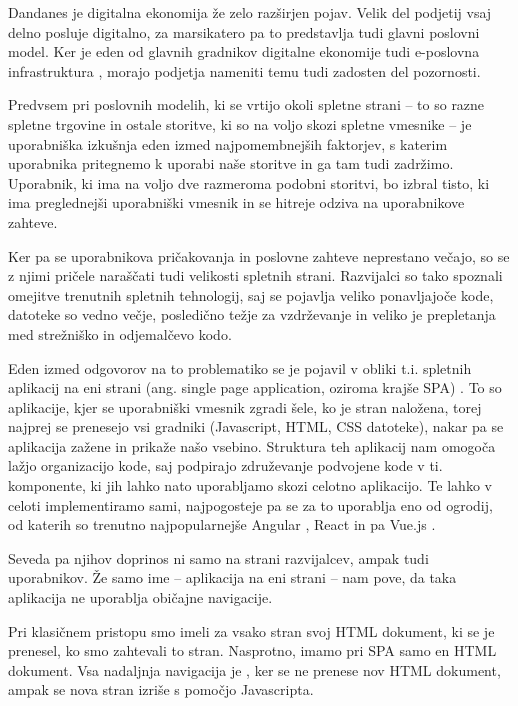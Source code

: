 \documentclass[a4paper, 12pt]{book}
\begin{document}
Dandanes je digitalna ekonomija že zelo razširjen pojav. Velik del podjetij vsaj delno posluje digitalno, za marsikatero pa to predstavlja tudi glavni poslovni model. Ker je eden od glavnih gradnikov digitalne ekonomije tudi e-poslovna infrastruktura \cite{digital_econ}, morajo podjetja nameniti temu tudi zadosten del pozornosti.

Predvsem pri poslovnih modelih, ki se vrtijo okoli spletne strani – to so razne spletne trgovine in ostale storitve, ki so na voljo skozi spletne vmesnike – je uporabniška izkušnja eden izmed najpomembnejših faktorjev, s katerim uporabnika pritegnemo k uporabi naše storitve in ga tam tudi zadržimo. Uporabnik, ki ima na voljo dve razmeroma podobni storitvi, bo izbral  tisto, ki ima preglednejši uporabniški vmesnik in se hitreje odziva na uporabnikove zahteve. 

Ker pa se uporabnikova pričakovanja in poslovne zahteve neprestano večajo, so se z njimi pričele naraščati tudi velikosti spletnih strani. Razvijalci so tako spoznali omejitve trenutnih spletnih tehnologij, saj se pojavlja veliko ponavljajoče kode, datoteke so vedno večje, posledično težje za vzdrževanje in veliko je prepletanja med strežniško in odjemalčevo kodo.

Eden izmed odgovorov na to problematiko se je pojavil v obliki t.i. spletnih aplikacij na eni strani (ang. single page application, oziroma krajše SPA) \cite{spa_blakit} \cite{spa_vs_multi} \cite{spa_presentation}. To so aplikacije, kjer se uporabniški vmesnik zgradi šele, ko je stran naložena, torej najprej se prenesejo vsi gradniki (Javascript, HTML, CSS datoteke), nakar pa se aplikacija zažene in prikaže našo vsebino. Struktura teh aplikacij nam omogoča lažjo organizacijo kode, saj podpirajo združevanje podvojene kode v ti. komponente, ki jih lahko nato uporabljamo skozi celotno aplikacijo. Te lahko v celoti implementiramo sami, najpogosteje pa se za to uporablja eno od ogrodij, od katerih so trenutno najpopularnejše Angular \cite{angular_website}, React \cite{react_website} in pa Vue.js \cite{vue_website}.

Seveda pa njihov doprinos ni samo na strani razvijalcev, ampak tudi uporabnikov. Že samo ime -- aplikacija na eni strani -- nam pove, da taka aplikacija ne uporablja običajne navigacije.

Pri klasičnem pristopu smo imeli za vsako stran svoj HTML dokument, ki se je prenesel, ko smo zahtevali to stran. Nasprotno, imamo pri SPA samo en HTML dokument. Vsa nadaljnja navigacija je , ker se ne prenese nov HTML dokument, ampak se nova stran izriše s pomočjo Javascripta.
\end{document}
